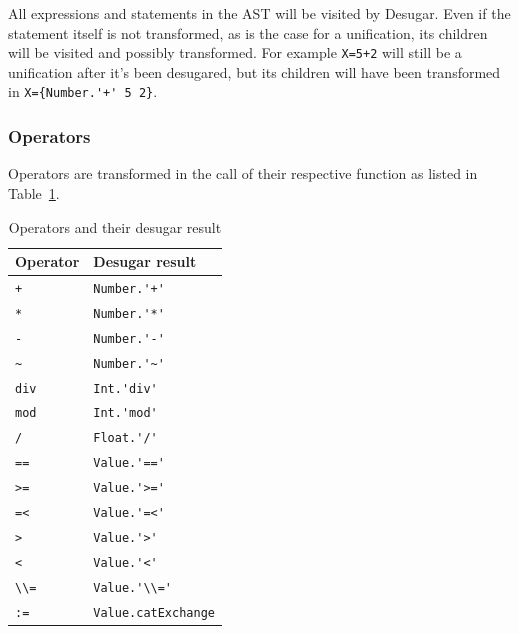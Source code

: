 \documentclass[a4paper]{memoir}
\begin{document}
All expressions and statements in the AST will be visited by Desugar. Even if the statement itself is not transformed, as is the case for a unification, its children will be visited and possibly transformed. For example
\lstinline!X=5+2! will still be a unification after it's been desugared, but its
children will have been transformed in \lstinline!X={Number.'+' 5 2}!.



\subsubsection{Operators}
Operators are transformed in the call of their respective function as listed in Table~\ref{table:operators}.

\begin{table}[h]
\begin{center}
\begin{tabular}{| l l |}
  \hline
  Operator & Desugar result \\
  \hline
  \lstinline!+! & \lstinline!Number.'+'! \\
  \lstinline!*! & \lstinline!Number.'*'! \\
  \lstinline!-! & \lstinline!Number.'-'! \\
  \lstinline!~! & \lstinline!Number.'~'! \\
  \lstinline!div! & \lstinline!Int.'div'! \\
  \lstinline!mod! & \lstinline!Int.'mod'! \\
  \lstinline!/! & \lstinline!Float.'/'! \\
  \lstinline!==! & \lstinline!Value.'=='! \\
  \lstinline!>=! & \lstinline!Value.'>='! \\
  \lstinline!=<! & \lstinline!Value.'=<'! \\
  \lstinline!>! & \lstinline!Value.'>'! \\
  \lstinline!<! & \lstinline!Value.'<'! \\
  \lstinline!\\=! & \lstinline!Value.'\\='! \\
  \lstinline!:=! & \lstinline!Value.catExchange! \\
  \hline
\end{tabular}
\end{center}
\caption{Operators and their desugar result}
\label{table:operators}
\end{table}
\end{document}
